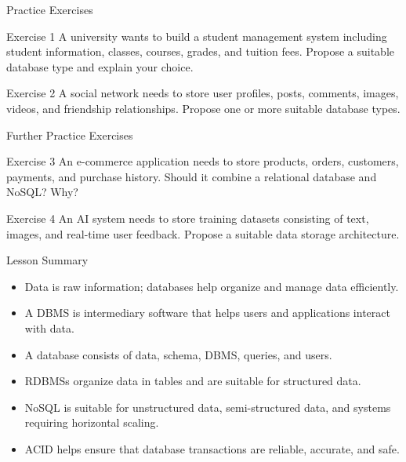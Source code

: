 \documentclass[aspectratio=169,11pt]{beamer}
\newcommand{\tightlist}{\setlength{\itemsep}{2pt}\setlength{\parskip}{0pt}}
\begin{document}
\begin{frame}{Practice Exercises}
\small
\begin{block}{Exercise 1}
A university wants to build a student management system including student information, classes, courses, grades, and tuition fees. Propose a suitable database type and explain your choice.
\end{block}

\begin{block}{Exercise 2}
A social network needs to store user profiles, posts, comments, images, videos, and friendship relationships. Propose one or more suitable database types.
\end{block}
\end{frame}

\begin{frame}{Further Practice Exercises}
\small
\begin{block}{Exercise 3}
An e-commerce application needs to store products, orders, customers, payments, and purchase history. Should it combine a relational database and NoSQL? Why?
\end{block}

\begin{block}{Exercise 4}
An AI system needs to store training datasets consisting of text, images, and real-time user feedback. Propose a suitable data storage architecture.
\end{block}
\end{frame}

\begin{frame}{Lesson Summary}
\small
\begin{itemize}
\tightlist
  \item Data is raw information; databases help organize and manage data efficiently.
  \item A DBMS is intermediary software that helps users and applications interact with data.
  \item A database consists of data, schema, DBMS, queries, and users.
  \item RDBMSs organize data in tables and are suitable for structured data.
  \item NoSQL is suitable for unstructured data, semi-structured data, and systems requiring horizontal scaling.
  \item ACID helps ensure that database transactions are reliable, accurate, and safe.
\end{itemize}
\end{frame}
\end{document}

